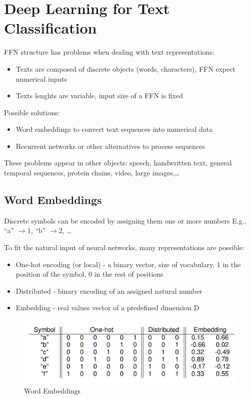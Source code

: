 \chapter{Deep Learning for Text Classification}

FFN structure has problems when dealing with text representations:
\begin{itemize}
	\item Texts are composed of discrete objects (words, characters), FFN expect
numerical inputs
	\item Texts lenghts are variable, input size of a FFN is fixed
\end{itemize}
Possible solutions:
\begin{itemize}
	\item Word embeddings to convert text sequences into numerical data
	\item Recurrent networks or other alternatives to process sequences
\end{itemize}
These problems appear in other objects: speech, handwritten text, general
temporal sequences, protein chains, video, large images,\dots

\section{Word Embeddings}

\begin{paracol}{2}
   
   Discrete symbols can be encoded by assigning them one or more numbers
   E.g., ``a'' $\rightarrow 1$, ``b'' $\rightarrow 2$, \dots
   
   To fit the natural input of neural networks, many representations are possible:
   \begin{itemize}
      \item One-hot encoding (or local) - a binary vector, size of vocabulary, 1 in the position of the symbol, 0 in the rest of positions
      \item Distributed - binary encoding of an assigned natural number
      \item Embedding - real values vector of a predefined dimension D
   \end{itemize}
      
   \switchcolumn

   \begin{figure}[htbp]
      \centering
      \includegraphics{images/09/embeddings.png}
      \caption{Word Embeddings}
      \label{fig:09/embeddings}
   \end{figure}

\end{paracol}

